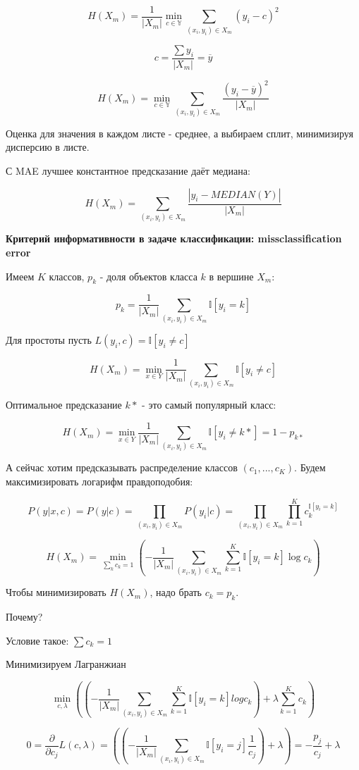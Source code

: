\documentclass[a4paper]{article}
\begin{document}
\begin{itemize}
\[ H(X_m) = \frac{1}{|X_m|} \min_{c \in \mathbb{Y}} \sum_{(x_i, y_i) \in X_m} (y_i - c)^2 \]

\[ c = \frac{\sum y_i}{|X_m|} = \overline{y} \]

\[ H(X_m) =  \min_{c \in \mathbb{Y}} \sum_{(x_i, y_i) \in X_m} \frac{(y_i - \overline{y})^2}{|X_m|} \]


Оценка для значения в каждом листе - среднее, а выбираем сплит, минимизируя дисперсию в листе.

С MAE лучшее константное предсказание даёт медиана:

\[ H(X_m) = \sum_{(x_i, y_i) \in X_m} \frac{|y_i - MEDIAN(Y)|}{|X_m|} \]

\textbf{Критерий информативности в задаче классификации: missclassification error}

Имеем $K$ классов, $p_k$ - доля объектов класса $k$ в вершине $X_m$:

\[ p_k = \frac{1}{|X_m|} \sum_{(x_i, y_i) \in X_m} \mathbb{I}[y_i = k] \]

Для простоты пусть $L(y_i, c) = \mathbb{I}[y_i \neq c] $

\[ H(X_m) = \min_{x \in Y} \frac{1}{|X_m|}  \sum_{(x_i, y_i) \in X_m} \mathbb{I} [y_i \neq c ] \]

Оптимальное предсказание $k*$ - это самый популярный класс:

\[ H(X_m) = \min_{x \in Y} \frac{1}{|X_m|}  \sum_{(x_i, y_i) \in X_m} \mathbb{I} [y_i \neq k* ] = 1 - p_{k*}\]

А сейчас хотим предсказывать распределение классов $(c_1, ..., c_K)$. Будем максимизировать логарифм правдоподобия:

\[ P(y|x, c) = P(y|c) = \prod_{(x_i, y_i) \in X_m} P(y_i|c) = \prod_{(x_i, y_i) \in X_m} \prod_{k=1}^K c_k^{\mathbb{I}[y_i=k]}\]

\[ H(X_m) = \min_{\sum_k c_k = 1} \left( -\frac{1}{|X_m|} \sum_{(x_i, y_i) \in X_m} \sum_{k=1}^K \mathbb{I} [y_i = k] \log c_k \right)\]

Чтобы минимизировать $H(X_m)$, надо брать $c_k = p_k$.

Почему?

Условие такое: $\sum c_k = 1$

Минимизируем Лагранжиан 

\[ \min_{c, \lambda} \left( \left( -\frac{1}{|X_m|} \sum_{(x_i, y_i) \in X_m} \sum_{k=1}^K \mathbb{I} [y_i = k] log c_k \right) + \lambda \sum_{k=1}^K c_k \right) \]

\[ 0 = \frac{\partial }{\partial c_j} L(c, \lambda) = \left( \left( -\frac{1}{|X_m|} \sum_{(x_i, y_i) \in X_m} \mathbb{I} [y_i = j] \frac{1}{c_j} \right) + \lambda  \right) = -\frac{p_j}{c_j} + \lambda \]


\end{itemize}
\end{document}
